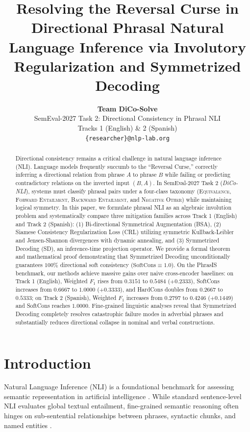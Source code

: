 \documentclass[11pt,a4paper,twocolumn]{article}
\title{\textbf{Resolving the Reversal Curse in Directional Phrasal Natural Language Inference via Involutory Regularization and Symmetrized Decoding}}
\author{
  \textbf{Team DiCo-Solve} \\
  SemEval-2027 Task 2: Directional Consistency in Phrasal NLI \\
  Tracks 1 (English) \& 2 (Spanish) \\
  \texttt{\{researcher\}@nlp-lab.org}
}
\date{}
\begin{document}
\maketitle

\begin{abstract}
Directional consistency remains a critical challenge in natural language inference (NLI). Language models frequently succumb to the ``Reversal Curse,'' correctly inferring a directional relation from phrase $A$ to phrase $B$ while failing or predicting contradictory relations on the inverted input $(B, A)$. In SemEval-2027 Task 2 (\textit{DiCo-NLI}), systems must classify phrasal pairs under a four-class taxonomy (\textsc{Equivalence}, \textsc{Forward Entailment}, \textsc{Backward Entailment}, and \textsc{Negative Other}) while maintaining logical symmetry. In this paper, we formulate phrasal NLI as an algebraic involution problem and systematically compare three mitigation families across Track 1 (English) and Track 2 (Spanish): (1) Bi-directional Symmetrical Augmentation (BSA), (2) Siamese Consistency Regularization Loss (CRL) utilizing symmetric Kullback-Leibler and Jensen-Shannon divergences with dynamic annealing, and (3) Symmetrized Decoding (SD), an inference-time projection operator. We provide a formal theorem and mathematical proof demonstrating that Symmetrized Decoding unconditionally guarantees $100\%$ directional soft consistency ($\text{SoftCons} \equiv 1.0$). On the PhrasIS benchmark, our methods achieve massive gains over naive cross-encoder baselines: on Track 1 (English), Weighted $F_1$ rises from $0.3151$ to $0.5484$ ($+0.2333$), SoftCons increases from $0.6667$ to $1.0000$ ($+0.3333$), and HardCons doubles from $0.2667$ to $0.5333$; on Track 2 (Spanish), Weighted $F_1$ increases from $0.2797$ to $0.4246$ ($+0.1449$) and SoftCons reaches $1.0000$. Fine-grained linguistic analyses reveal that Symmetrized Decoding completely resolves catastrophic failure modes in adverbial phrases and substantially reduces directional collapse in nominal and verbal constructions.
\end{abstract}

\section{Introduction}
\label{sec:introduction}

Natural Language Inference (NLI) is a foundational benchmark for assessing semantic representation in artificial intelligence \citep{bowman2015snli,williams2018multinli,dagan2013rte}. While standard sentence-level NLI evaluates global textual entailment, fine-grained semantic reasoning often hinges on sub-sentential relationships between phrases, syntactic chunks, and named entities \citep{lopezgazpio2027phrasis}. 
\end{document}
